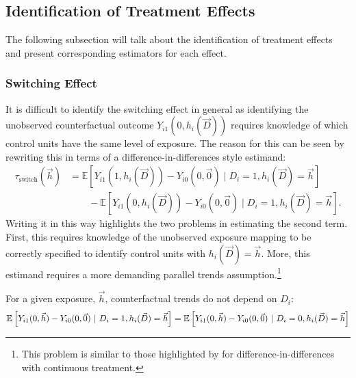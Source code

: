 \documentclass[11pt]{article}
\begin{document}
\subsection{Identification of Treatment Effects}\label{sec:remove_bias}

The following subsection will talk about the identification of treatment effects and present corresponding estimators for each effect. 

\subsubsection{Switching Effect}

It is difficult to identify the switching effect in general as identifying the unobserved counterfactual outcome $Y_{i1}(0, h_i(\vec{D}))$ requires knowledge of which control units have the same level of exposure. The reason for this can be seen by rewriting this in terms of a difference-in-differences style estimand:
\begin{align*}
    \tau_{\text{switch}}(\vec{h}) &= \mathbb{E} \left[ Y_{i1}(1, h_i(\vec{D})) - Y_{i0}(0,\vec{0}) \mid D_i = 1, h_i(\vec{D}) = \vec{h} \right] \\ 
    &\quad\quad - \mathbb{E} \left[ Y_{i1}(0, h_i(\vec{D})) - Y_{i0}(0,\vec{0}) \mid D_i = 1, h_i(\vec{D}) = \vec{h} \right].
\end{align*}
Writing it in this way highlights the two problems in estimating the second term. First, this requires knowledge of the unobserved exposure mapping to be correctly specified to identify control units with $h_i(\vec{D}) = \vec{h}$. More, this estimand requires a more demanding parallel trends assumption.\footnote{This problem is similar to those highlighted by \citet{Callaway_Goodman-Bacon_SantAnna_2021} for difference-in-differences with continuous treatment.}  

\begin{assumption}\label{assumption:parallel-switching}
    For a given exposure, $\vec{h}$, counterfactual trends do not depend on $D_i$:
    \[ 
        \mathbb{E}\left[Y_{i1}(0, \vec{h}) - Y_{i0}(0, \vec{0}) \ \vert \ D_i = 1, h_i(\vec{D}) = \vec{h} \right] = 
        \mathbb{E}\left[Y_{i1}(0, \vec{h}) - Y_{i0}(0, \vec{0}) \ \vert \ D_i = 0, h_i(\vec{D}) = \vec{h} \right]
    \]
\end{assumption}
\end{document}
